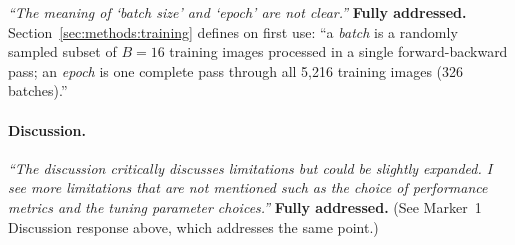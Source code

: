 \documentclass[12pt, a4paper, twoside, openright]{book}
\begin{document}
\begin{appendices}
\textit{``The meaning of `batch size' and `epoch' are not clear.''}
\textbf{Fully addressed.} Section~\ref{sec:methods:training} defines on first use: ``a \emph{batch} is a randomly sampled subset of $B=16$ training images processed in a single forward-backward pass; an \emph{epoch} is one complete pass through all 5,216 training images (326 batches).''

\paragraph{Discussion.}
\textit{``The discussion critically discusses limitations but could be slightly expanded. I see more limitations that are not mentioned such as the choice of performance metrics and the tuning parameter choices.''}
\textbf{Fully addressed.} (See Marker~1 Discussion response above, which addresses the same point.)

\end{appendices}

\end{document}
